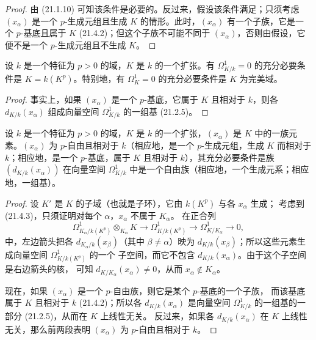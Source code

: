 \begin{proof}
由 (21.1.10) 可知该条件是必要的。反过来，假设该条件满足；只须考虑
$(x_\alpha)$ 是一个 $p$-生成元组且生成 $K$ 的情形。此时，$(x_\alpha)$
有一个子族，它是一个 $p$-基底且属于 $K$ (21.4.2)；但这个子族不可能不同于
$(x_\alpha)$，否则由假设，它便不是一个 $p$-生成元组且不生成 $K$。
\end{proof}

\begin{corollary}[21.4.4]
\label{0.21.4.4-fr}
设 $k$ 是一个特征为 $p>0$ 的域，$K$ 是 $k$ 的一个扩张。有
$\Omega^1_{K/k}=0$ 的充分必要条件是 $K=k(K^p)$。特别地，有
$\Omega^1_K=0$ 的充分必要条件是 $K$ 为完美域。
\end{corollary}

\begin{proof}
事实上，如果 $(x_\alpha)$ 是一个 $p$-基底，它属于 $K$ 且相对于 $k$，则各
$d_{K/k}(x_\alpha)$ 组成向量空间 $\Omega^1_{K/k}$ 的一组基 (21.2.5)。
\end{proof}

\begin{theorem}[21.4.5]
\label{0.21.4.5-fr}
设 $k$ 是一个特征为 $p>0$ 的域，$K$ 是 $k$ 的一个扩张，$(x_\alpha)$ 是
$K$ 中的一族元素。$(x_\alpha)$ 为 $p$-自由且相对于 $k$（相应地，是一个
$p$-生成元组，生成 $K$ 而相对于 $k$；相应地，是一个 $p$-基底，属于 $K$
且相对于 $k$），其充分必要条件是族 $(d_{K/k}(x_\alpha))$ 在向量空间
$\Omega^1_{K/k}$ 中是一个自由族（相应地，一个生成元系；相应地，一组基）。
\end{theorem}

\begin{proof}
设 $K'$ 是 $K$ 的子域（也就是子环），它由 $k(K^p)$ 与各 $x_\alpha$ 生成；
考虑到 (21.4.3)，只须证明对每个 $\alpha$，$x_\alpha$ 不属于 $K_\alpha$。
在正合列
\[
\Omega^1_{K_\alpha/k(K^p)}\otimes_{K_\alpha}K\longrightarrow
\Omega^1_{K/k(K^p)}\longrightarrow\Omega^1_{K/K_\alpha}\longrightarrow0,
\]
中，左边箭头把各 $d_{K_\alpha/k}(x_\beta)$（其中 $\beta\neq\alpha$）映为
$d_{K/k}(x_\beta)$；所以这些元素生成向量空间 $\Omega^1_{K/k(K^p)}$ 的一个
子空间，而它不包含 $d_{K/k}(x_\alpha)$。由于这个子空间是右边箭头的核，
可知 $d_{K/K_\alpha}(x_\alpha)\neq0$，从而 $x_\alpha\notin K_\alpha$。

现在，如果 $(x_\alpha)$ 是一个 $p$-自由族，则它是某个 $p$-基底的一个子族，
而该基底属于 $K$ 且相对于 $k$ (21.4.2)；所以各 $d_{K/k}(x_\alpha)$ 是向量空间
$\Omega^1_{K/k}$ 的一组基的一部分 (21.2.5)，从而在 $K$ 上线性无关。
反过来，如果各 $d_{K/k}(x_\alpha)$ 在 $K$ 上线性无关，那么前两段表明
$(x_\alpha)$ 为 $p$-自由且相对于 $k$。
\end{proof}


